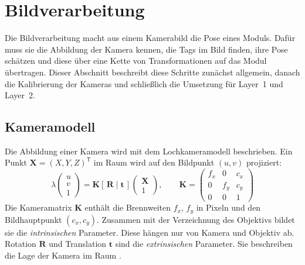 \section{Bildverarbeitung}
\label{sec:bildverarbeitung}
Die Bildverarbeitung macht aus einem Kamerabild die Pose eines Moduls. Dafür muss sie die Abbildung der Kamera kennen, die Tags im Bild finden, ihre Pose schätzen und diese über eine Kette von Transformationen auf das Modul übertragen. Dieser Abschnitt beschreibt diese Schritte zunächst allgemein, danach die Kalibrierung der Kameras und schließlich die Umsetzung für Layer~1 und Layer~2.

\subsection{Kameramodell}
\label{subsec:bv-kameramodell}
Die Abbildung einer Kamera wird mit dem Lochkameramodell beschrieben. Ein Punkt $\mathbf{X} = (X, Y, Z)^{\mathsf{T}}$ im Raum wird auf den Bildpunkt $(u, v)$ projiziert:
\begin{equation}
    \lambda \begin{pmatrix} u \\ v \\ 1 \end{pmatrix}
    = \mathbf{K} \left[\, \mathbf{R} \mid \mathbf{t} \,\right] \begin{pmatrix} \mathbf{X} \\ 1 \end{pmatrix},
    \qquad
    \mathbf{K} = \begin{pmatrix} f_x & 0 & c_x \\ 0 & f_y & c_y \\ 0 & 0 & 1 \end{pmatrix}
    \label{eq:bv-lochkamera}
\end{equation}
Die Kameramatrix $\mathbf{K}$ enthält die Brennweiten $f_x$, $f_y$ in Pixeln und den Bildhauptpunkt $(c_x, c_y)$. Zusammen mit der Verzeichnung des Objektivs bildet sie die \emph{intrinsischen} Parameter. Diese hängen nur von Kamera und Objektiv ab. Rotation $\mathbf{R}$ und Translation $\mathbf{t}$ sind die \emph{extrinsischen} Parameter. Sie beschreiben die Lage der Kamera im Raum \cite{Hartley2004}.

